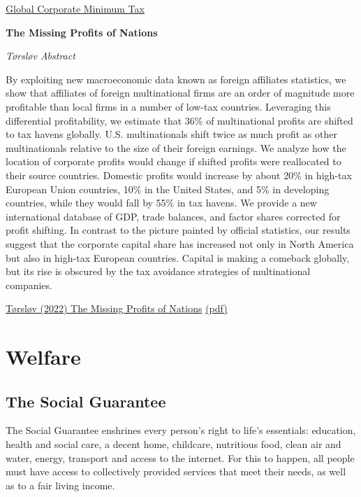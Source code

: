 \documentclass[
]{book}
\begin{document}
\href{https://www.taxjustice.net/2021/04/07/us-treasury-secretary-yellen-confirms-its-time-to-end-the-race-to-the-bottom-on-corporate-tax/}{Global Corporate Minimum Tax}

\textbf{The Missing Profits of Nations}

\emph{Tørsløv Abstract}

By exploiting new macroeconomic data known as foreign affiliates statistics, we show that affiliates of foreign multinational firms are an order of magnitude more profitable than local firms in a number of low-tax countries. Leveraging this differential profitability, we estimate that 36\% of multinational profits are shifted to tax havens globally. U.S. multinationals shift twice as much profit as other multinationals relative to the size of their foreign earnings. We analyze how the location of corporate profits would change if shifted profits were reallocated to their source countries. Domestic profits would increase by about 20\% in high-tax European Union countries, 10\% in the United States, and 5\% in developing countries, while they would fall by 55\% in tax havens. We provide a new international database of GDP, trade balances, and factor shares corrected for profit shifting. In contrast to the picture painted by official statistics, our results suggest that the corporate capital share has increased not only in North America but also in high-tax European countries. Capital is making a comeback globally, but its rise is obscured by the tax avoidance strategies of multinational companies.

\href{https://www.restud.com/paper/the-missing-profits-of-nations/}{Tørsløv (2022) The Missing Profits of Nations}
\href{pdf/Torslov_2022_The_Missing_Profits_of_Nations.pdf}{(pdf)}

\hypertarget{welfare}{%
\chapter{Welfare}\label{welfare}}

\hypertarget{the-social-guarantee}{%
\section{The Social Guarantee}\label{the-social-guarantee}}

The Social Guarantee enshrines every person's right to life's essentials: education, health and social care, a decent home, childcare, nutritious food, clean air and water, energy, transport and access to the internet. For this to happen, all people must have access to collectively provided services that meet their needs, as well as to a fair living income.
\end{document}
